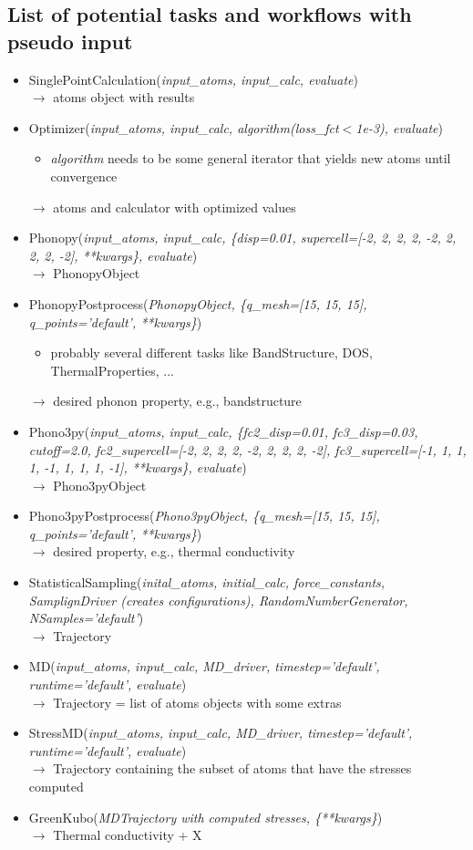 \documentclass [notitlepage, 12pt, a4paper]{article}
\begin{document}
\subsection{List of potential tasks and workflows with pseudo input}
\begin{itemize}
	\item SinglePointCalculation(\emph{input\_atoms, input\_calc, evaluate})\\
	$\longrightarrow$ atoms object with results
	\item Optimizer(\emph{input\_atoms, input\_calc, 
	algorithm(loss\_fct$<$1e-3), evaluate})
	\begin{itemize}
		\item \emph{algorithm} needs to be some general iterator that yields 
		new atoms
		until convergence
	\end{itemize}
	$\longrightarrow$ atoms and calculator with optimized values
	\item Phonopy(\emph{input\_atoms, input\_calc, \{disp=0.01, 
			supercell=[-2, 2, 2, 2, -2, 2, 2, 2, -2], **kwargs\}, evaluate})\\
		$\longrightarrow$ PhonopyObject
	\item PhonopyPostprocess(\emph{PhonopyObject,
		\{q\_mesh=[15, 15, 15], q\_points='default', **kwargs\}})
	\begin{itemize}
		\item probably several different tasks like BandStructure, DOS, 
		ThermalProperties, ...
	\end{itemize}
	$\longrightarrow$  desired phonon property, e.g., bandstructure
	\item Phono3py(\emph{input\_atoms, input\_calc, \{fc2\_disp=0.01, 
	fc3\_disp=0.03, cutoff=2.0, fc2\_supercell=[-2, 2, 2, 2, -2, 2, 2, 2, -2],
		fc3\_supercell=[-1, 1, 1, 1, -1, 1, 1, 1, -1], **kwargs\}, evaluate})\\
	$\longrightarrow$  Phono3pyObject
	\item Phono3pyPostprocess(\emph{Phono3pyObject,
		\{q\_mesh=[15, 15, 15], q\_points='default', **kwargs\}}) \\
	$\longrightarrow$  desired property, e.g., thermal conductivity
	\item StatisticalSampling(\emph{inital\_atoms, initial\_calc, 
		force\_constants, SamplignDriver (creates configurations), 
		RandomNumberGenerator, NSamples='default'})\\
	$\longrightarrow$ Trajectory 
	\item MD(\emph{input\_atoms, input\_calc, MD\_driver, 
		timestep='default', runtime='default', evaluate}) \\
		$\longrightarrow$ Trajectory = list of atoms objects with some extras
	\item StressMD(\emph{input\_atoms, input\_calc, MD\_driver, 
		timestep='default', runtime='default', evaluate})\\
	$\longrightarrow$ Trajectory containing the subset of atoms that have the 
	stresses 
	computed
	\item GreenKubo(\emph{MDTrajectory with computed stresses, \{**kwargs\}}) \\
	$\longrightarrow$ Thermal conductivity + X
\end{itemize}
\end{document}
